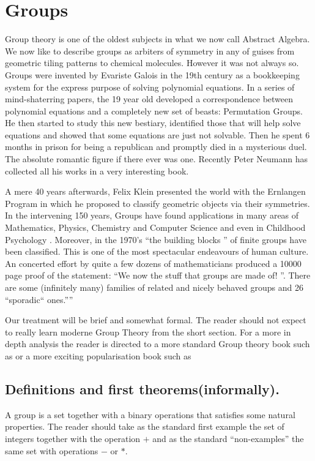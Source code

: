 \section{Groups}

Group theory is one of the oldest subjects in what we now call Abstract Algebra. We now like to describe groups as arbiters of symmetry in any of guises from geometric tiling patterns to chemical molecules. However it was not always so. Groups were invented by Evariste Galois in the 19th century as a bookkeeping system  for the express purpose of solving polynomial equations. In a series of mind-shaterring papers, the 19 year old developed a correspondence between  polynomial equations and a completely new set of beasts: Permutation Groups. He then started to study this new bestiary, identified  those that will help solve equations and showed that some equations are just not solvable. Then he spent 6 months in prison for being a republican and promptly died in a mysterious duel. The absolute romantic figure if there ever was one. Recently Peter Neumann has collected all his works in a very interesting book\cite{Galois:2011aa}.

 A mere 40 years afterwards, Felix Klein presented the world with the Ernlangen Program \cite{klein1893} in which he  proposed to classify geometric objects via their symmetries. In the intervening 150 years, Groups have found applications in many areas of Mathematics, Physics, Chemistry and Computer Science  and even in Childhood Psychology \cite{piaget1960logic}.  Moreover, in the 1970's ``the building blocks '' of finite groups have been classified. This is one of the most spectacular endeavours of human culture. An concerted effort by quite a few dozens of mathematicians produced a 10000 page proof of the statement: ``We now the stuff that groups are made of! ''. There are some (infinitely many) families of related and nicely behaved groups and 26 ``sporadic`` ones.'''' 
 
 Our treatment will be brief and somewhat formal. The reader should not expect to really learn moderne Group Theory from the short section.  For a more in depth analysis the reader is directed to a more standard Group theory book such as \cite{scott2012group} or a more exciting popularisation book such as \cite{Sautoy:2009aa,Sautoy:2012aa, Ronan:2007aa}

\subsection{Definitions and first theorems(informally).}
A group is a set together with a binary operations that satisfies some natural properties. The reader should take as the standard first example the set of integers together with the operation $+$ and as the standard ``non-examples'' the same set with operations $-$ or $*$. 

